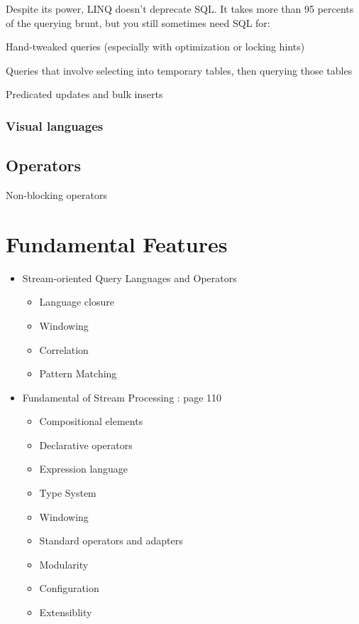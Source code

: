 Despite its power, LINQ doesn't deprecate SQL. It takes more than 95 percents of the querying brunt, but you still sometimes need SQL for:

Hand-tweaked queries (especially with optimization or locking hints)

Queries that involve selecting into temporary tables, then querying those tables

Predicated updates and bulk inserts

\subsubsection*{Visual languages} \citep{Henrique:2014}

\subsection*{Operators}
Non-blocking operators




\section{Fundamental Features}

\begin{itemize}
\item Stream-oriented Query Languages and Operators
	\begin{itemize}
		\item Language closure
		\item Windowing
		\item Correlation
		\item Pattern Matching
	\end{itemize}
	
\item Fundamental of Stream Processing : page 110
	\begin{itemize}
		\item Compositional elements
		\item Declarative operators
		\item Expression language
		\item Type System
		\item Windowing
		\item Standard operators and adapters
		\item Modularity
		\item Configuration
		\item Extensiblity
	\end{itemize}
\end{itemize}


